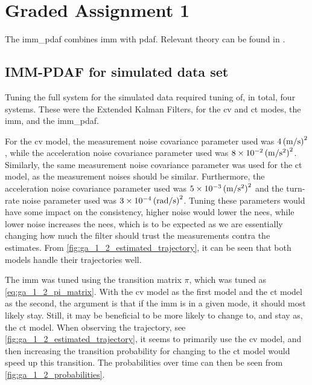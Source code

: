 \section{Graded Assignment 1}\label{sec:graded_assignment_1}
The \acrshort{imm_pdaf} combines \acrfull{imm} with \acrfull{pdaf}. Relevant theory can be found in \cite[p. 100-101, 120 - 122]{Edmund}. 

\subsection{IMM-PDAF for simulated data set}
Tuning the full system for the simulated data required tuning of, in total, four systems. These were the Extended Kalman Filters, for the \acrfull{cv} and \acrfull{ct} modes, the \acrshort{imm}, and the \acrshort{imm_pdaf}. 

For the \acrshort{cv} model, the measurement noise covariance parameter used was $\SI{4}{(\meter\per\second)\squared}$, while the acceleration noise covariance parameter used was $\SI{8e-2}{(\meter\per\second\squared)\squared}$. Similarly, the same measurement noise covariance parameter was used for the \acrshort{ct} model, as the measurement noises should be similar. Furthermore, the acceleration noise covariance parameter used was $\SI{5e-3}{(\meter\per\second\squared)\squared}$ and the turn-rate noise parameter used was $\SI{3e-4}{(\radian\per\second)\squared}$. Tuning these parameters would have some impact on the consistency, higher noise would lower the \acrshort{nees}, while lower noise increases the \acrshort{nees}, which is to be expected as we are essentially changing how much the filter should trust the measurements contra the estimates. From \cref{fig:ga_1_2_estimated_trajectory}, it can be seen that both models handle their trajectories well. 

The \acrshort{imm} was tuned using the transition matrix $\pi$, which was tuned as \cref{eq:ga_1_2_pi_matrix}. With the \acrshort{cv} model as the first model and the \acrshort{ct} model as the second, the argument is that if the \acrshort{imm} is in a given mode, it should most likely stay. Still, it may be beneficial to be more likely to change to, and stay as, the \acrshort{ct} model. When observing the trajectory, see \cref{fig:ga_1_2_estimated_trajectory}, it seems to primarily use the \acrshort{cv} model, and then increasing the transition probability for changing to the \acrshort{ct} model would speed up this transition. The probabilities over time can then be seen from \cref{fig:ga_1_2_probabilities}.

